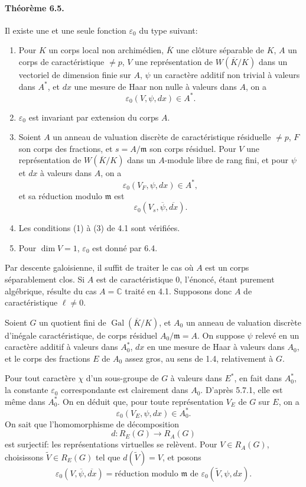 \documentclass[10pt,letterpaper]{article}
\newcommand{\C}{\mathbb C}
\newcommand{\Gal}{\operatorname{Gal}}
\providecommand{\Gal}{\operatorname{Gal}}
\providecommand{\Gal}{\operatorname{Gal}}
\providecommand{\Gal}{\operatorname{Gal}}
\providecommand{\Gal}{\operatorname{Gal}}
\begin{document}
\paragraph{Théorème 6.5.} Il existe une et une seule fonction \(\varepsilon_0\) du type suivant:
\begin{enumerate}[label=(\alph*)]
\item Pour \(K\) un corps local non archimédien, \(\overline K\) une clôture séparable de \(K\), \(A\) un corps de caractéristique \(\ne p\), \(V\) une représentation de \(W(\overline K/K)\) dans un vectoriel de dimension finie sur \(A\), \(\psi\) un caractère additif non trivial à valeurs dans \(A^*\), et \(dx\) une mesure de Haar non nulle à valeurs dans \(A\), on a
\[
\varepsilon_0(V,\psi,dx)\in A^*.
\]
\item \(\varepsilon_0\) est invariant par extension du corps \(A\).
\item Soient \(A\) un anneau de valuation discrète de caractéristique résiduelle \(\ne p\), \(F\) son corps des fractions, et \(s=A/\mathfrak m\) son corps résiduel. Pour \(V\) une représentation de \(W(\overline K/K)\) dans un \(A\)-module libre de rang fini, et pour \(\psi\) et \(dx\) à valeurs dans \(A\), on a
\[
\varepsilon_0(V_F,\psi,dx)\in A^*,
\]
et sa réduction modulo \(\mathfrak m\) est
\[
\varepsilon_0(V_s,\overline\psi,\overline{dx}).
\]
\item Les conditions (1) à (3) de 4.1 sont vérifiées.
\item Pour \(\dim V=1\), \(\varepsilon_0\) est donné par 6.4.
\end{enumerate}

Par descente galoisienne, il suffit de traiter le cas où \(A\) est un corps séparablement clos. Si \(A\) est de caractéristique \(0\), l'énoncé, étant purement algébrique, résulte du cas \(A=\C\) traité en 4.1. Supposons donc \(A\) de caractéristique \(\ell\ne0\).

Soient \(G\) un quotient fini de \(\Gal(\overline K/K)\), et \(A_0\) un anneau de valuation discrète d'inégale caractéristique, de corps résiduel \(A_0/\mathfrak m=A\). On suppose \(\psi\) relevé en un caractère additif à valeurs dans \(A_0^*\), \(dx\) en une mesure de Haar à valeurs dans \(A_0\), et le corps des fractions \(E\) de \(A_0\) assez gros, au sens de 1.4, relativement à \(G\).

Pour tout caractère \(\chi\) d'un sous-groupe de \(G\) à valeurs dans \(E^*\), en fait dans \(A_0^*\), la constante \(\varepsilon_0\) correspondante est clairement dans \(A_0\). D'après 5.7.1, elle est même dans \(A_0^*\). On en déduit que, pour toute représentation \(V_E\) de \(G\) sur \(E\), on a
\[
\varepsilon_0(V_E,\psi,dx)\in A_0^*.
\]
On sait que l'homomorphisme de décomposition
\[
d:R_E(G)\longrightarrow R_A(G)
\]
est surjectif: les représentations virtuelles se relèvent. Pour \(V\in R_A(G)\), choisissons \(\widetilde V\in R_E(G)\) tel que \(d(\widetilde V)=V\), et posons
\[
\varepsilon_0(V,\overline\psi,\overline{dx})
=
\text{réduction modulo }\mathfrak m\text{ de }
\varepsilon_0(\widetilde V,\psi,dx).
\]
\end{document}
